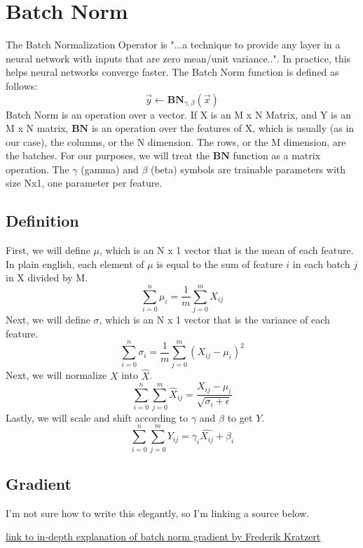 \documentclass{article}
\begin{document}
\noindent\makebox[\linewidth]{\rule{\paperwidth}{0.4pt}}
    \section{Batch Norm}
        The Batch Normalization Operator is "...a technique to provide any layer in a neural network with inputs that are zero mean/unit
        variance..".  In practice, this helps neural networks converge faster. The Batch Norm function is defined as follows:
        $$\overrightarrow{y} \leftarrow \boldsymbol{BN}_{\gamma, \beta}(\overrightarrow{x})$$
        Batch Norm is an operation over a vector.  If X is an M x N Matrix, and Y is an M x N matrix, $\boldsymbol{BN}$ is an operation
        over the features of X, which is usually (as in our case), the columns, or the N dimension. The rows, 
        or the M dimension, are the batches. For our purposes, 
        we will treat the $\boldsymbol{BN}$ function as a matrix operation. The $\gamma$ (gamma) and $\beta$ (beta) symbols 
        are trainable parameters with size Nx1, one parameter per feature.
    \subsection{Definition}
        First, we will define $\mu$, which is an N x 1 vector that is the mean of each feature. In plain english, each element of
        $\mu$ is equal to the sum of feature $i$ in each batch $j$ in X divided by M. 
        $$\sum_{i=0}^{n} \mu_i = \frac{1}{m} \sum_{j=0}^{m} X_{ij}$$
        Next, we will define $\sigma$, which is an N x 1 vector that is the variance of each feature.
        $$\sum_{i=0}^{n} \sigma_i = \frac{1}{m} \sum_{j=0}^{m} (X_{ij} - \mu_i)^2$$
        Next, we will normalize $X$ into $\hat{X}$.
        $$\sum_{i=0}^{n} \sum_{j=0}^{m} \hat{X}_{ij} = \frac{X_{ij} - \mu_i}{\sqrt{\sigma_i + \epsilon}}$$
        Lastly, we will scale and shift according to $\gamma$ and $\beta$ to get $Y$. 
        $$\sum_{i=0}^{n} \sum_{j=0}^{m} Y_{ij} = \gamma_i\hat{X_{ij}} + \beta_i$$
    \subsection{Gradient}
        I'm not sure how to write this elegantly, so I'm linking a source below. 

        \href{https://kratzert.github.io/2016/02/12/understanding-the-gradient-flow-through-the-batch-normalization-layer.html}{link
        to in-depth explanation of batch norm gradient by Frederik Kratzert}
\end{document}
